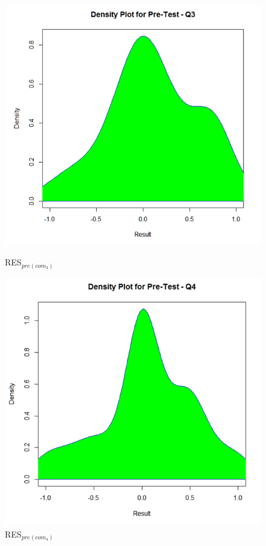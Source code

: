 \begin{figure}
	\centering
	\begin{minipage}{.5\textwidth}
		\centering
		\includegraphics[width=1\linewidth]{figures/Pretest_q3}
		\caption{RES$_{pre(com_3)}$}
		\label{fig:Pretest_q3}
	\end{minipage}%
	\begin{minipage}{.5\textwidth}
		\centering
		\includegraphics[width=1\linewidth]{figures/Pretest_q4}
		\caption{RES$_{pre(com_4)}$}
		\label{fig:Pretest_q4}
	\end{minipage}
\end{figure}
